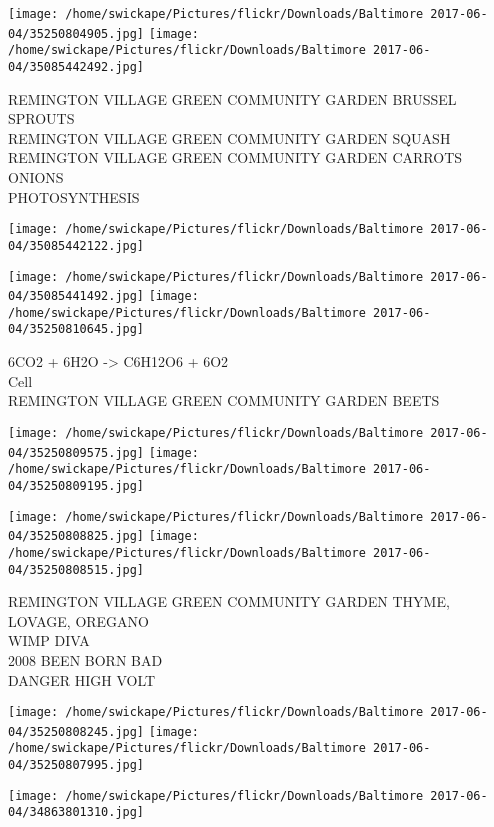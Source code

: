 \documentclass[10pt,letterpaper]{article}
\begin{document}
\texttt{[image: /home/swickape/Pictures/flickr/Downloads/Baltimore 2017-06-04/35250804905.jpg]}
\texttt{[image: /home/swickape/Pictures/flickr/Downloads/Baltimore 2017-06-04/35085442492.jpg]}

REMINGTON VILLAGE GREEN COMMUNITY GARDEN BRUSSEL SPROUTS\\
REMINGTON VILLAGE GREEN COMMUNITY GARDEN SQUASH\\
REMINGTON VILLAGE GREEN COMMUNITY GARDEN CARROTS ONIONS\\
PHOTOSYNTHESIS\\
\pagebreak

\texttt{[image: /home/swickape/Pictures/flickr/Downloads/Baltimore 2017-06-04/35085442122.jpg]}

\vspace{0.25in}
\texttt{[image: /home/swickape/Pictures/flickr/Downloads/Baltimore 2017-06-04/35085441492.jpg]}
\texttt{[image: /home/swickape/Pictures/flickr/Downloads/Baltimore 2017-06-04/35250810645.jpg]}

6CO2 + 6H2O {-}> C6H12O6 + 6O2\\
Cell\\
REMINGTON VILLAGE GREEN COMMUNITY GARDEN BEETS\\
\pagebreak

\texttt{[image: /home/swickape/Pictures/flickr/Downloads/Baltimore 2017-06-04/35250809575.jpg]}
\texttt{[image: /home/swickape/Pictures/flickr/Downloads/Baltimore 2017-06-04/35250809195.jpg]}

\texttt{[image: /home/swickape/Pictures/flickr/Downloads/Baltimore 2017-06-04/35250808825.jpg]}
\texttt{[image: /home/swickape/Pictures/flickr/Downloads/Baltimore 2017-06-04/35250808515.jpg]}

REMINGTON VILLAGE GREEN COMMUNITY GARDEN THYME, LOVAGE, OREGANO\\
WIMP DIVA\\
2008 BEEN BORN BAD\\
DANGER HIGH VOLT\\
\pagebreak

\texttt{[image: /home/swickape/Pictures/flickr/Downloads/Baltimore 2017-06-04/35250808245.jpg]}
\texttt{[image: /home/swickape/Pictures/flickr/Downloads/Baltimore 2017-06-04/35250807995.jpg]}

\vspace{0.25in}
\texttt{[image: /home/swickape/Pictures/flickr/Downloads/Baltimore 2017-06-04/34863801310.jpg]}
\end{document}
